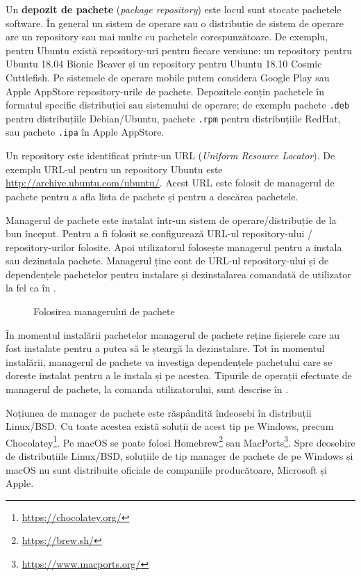 Un \textbf{depozit de pachete} (\textit{package repository}) este locul sunt stocate pachetele software.
În general un sistem de operare sau o distribuție de sistem de operare are un repository sau mai multe cu pachetele corespunzătoare.
De exemplu, pentru Ubuntu există repository-uri pentru fiecare versiune: un repository pentru Ubuntu 18.04 Bionic Beaver și un repository pentru Ubuntu 18.10 Cosmic Cuttlefish.
Pe sistemele de operare mobile putem considera Google Play sau Apple AppStore repository-urile de pachete.
Depozitele conțin pachetele în formatul specific distribuției sau sistemului de operare;
de exemplu pachete \texttt{.deb} pentru distribuțiile Debian/Ubuntu, pachete \texttt{.rpm} pentru distribuțiile RedHat, sau pachete \texttt{.ipa} în Apple AppStore.

Un repository este identificat printr-un URL  (\textit{Uniform Resource Locator}).
De exemplu URL-ul pentru un repository Ubuntu este \url{http://archive.ubuntu.com/ubuntu/}.
Acest URL este folosit de managerul de pachete pentru a afla lista de pachete și pentru a descărca pachetele.

Managerul de pachete este instalat într-un sistem de operare/distribuție de la bun început.
Pentru a fi folosit se configurează URL-ul repository-ului / repository-urilor folosite.
Apoi utilizatorul folosește managerul pentru a instala sau dezinstala pachete.
Managerul ține cont de URL-ul repository-ului și de dependențele pachetelor pentru instalare și dezinstalarea comandată de utilizator la fel ca în .

\begin{figure}[htbp]
  \centering
  \def\svgwidth{\columnwidth}
  
  \caption{Folosirea managerului de pachete}
  \label{fig:package:manager}
\end{figure}

În momentul instalării pachetelor managerul de pachete reține fișierele care au fost instalate pentru a putea să le șteargă la dezinstalare.
Tot în momentul instalării, managerul de pachete va investiga dependențele pachetului care se dorește instalat pentru a le instala și pe acestea.
Tipurile de operații efectuate de managerul de pachete, la comanda utilizatorului, sunt descrise în .

Noțiunea de manager de pachete este răspândită îndeosebi în distribuții Linux/BSD.
Cu toate acestea există soluții de acest tip pe Windows, precum Chocolatey\footnote{\url{https://chocolatey.org/}}.
Pe macOS se poate folosi Homebrew\footnote{\url{https://brew.sh/}} sau MacPorts\footnote{\url{https://www.macports.org/}}.
Spre deosebire de distribuțiile Linux/BSD, soluțiile de tip manager de pachete de pe Windows și macOS nu sunt distribuite oficiale de companiile producătoare, Microsoft și Apple.

